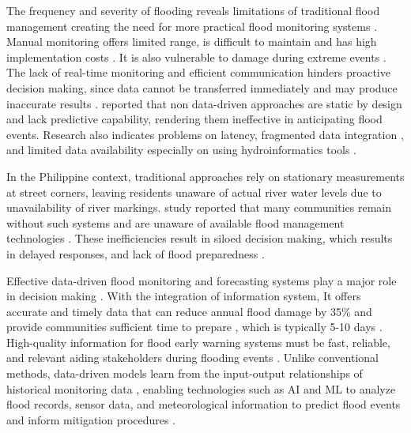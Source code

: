 \documentclass{research}
\begin{document}
The frequency and severity of flooding reveals limitations of traditional flood 
management creating the need for more practical flood monitoring systems 
\cite{bukhari2025review} \cite{Won_Lee_Moon_Moon_2022} \cite{KHOSHKONESH2024175859}.
Manual monitoring offers limited range, is difficult to maintain and has high 
implementation costs \cite{Pahuriray_Cerna_2025}. It is also vulnerable to damage 
during extreme events \cite{idoghor2026remote} \cite{Sengupta_2024}. The lack of 
real-time monitoring and efficient communication hinders proactive decision making, 
since data cannot be transferred immediately and may produce inaccurate results 
\cite{Ikechukwu_Idigo_Nnebe_Ozue_Agwunobi_2024} \cite{tolentino2022real}. 
\cite{Attobrah_Ohaka_Ifionu_Njemanze_Okonkwo_2026} reported 
that non data-driven approaches are static by design and lack predictive capability, 
rendering them ineffective in anticipating flood events. Research also indicates
problems on latency, fragmented data integration \cite{Khan2025}, and limited data availability 
especially on using hydroinformatics tools \cite{w15010178}.

In the Philippine context, traditional approaches rely on stationary measurements 
at street corners, leaving residents unaware of actual river water levels 
\cite{Crucillo_Lucero_Gelito_Medina_Palconit_2026} due to unavailability of river markings. 
\cite{demesa2025gis} study reported that many communities remain 
without such systems and are unaware of available flood management technologies 
. These inefficiencies result in siloed decision making, which results in 
delayed responses, and lack of flood preparedness 
\cite{Mukherjee2024} \cite{rs17173104}.

Effective data-driven flood monitoring and forecasting systems play a major role 
in decision making \cite{koutsovili2023early}. With the integration of information system,
It offers accurate and timely data 
that can reduce annual flood damage by 35\% \cite{samansiri2023characteristics} 
and provide communities sufficient time to prepare 
\cite{w14142221} \cite{Mirro2025} \cite{kuhaneswaran2025evolution}, 
which is typically 5-10 days \cite{palash2024datadriven}. 
High-quality information for flood early warning systems must be fast, reliable, 
and relevant aiding stakeholders during flooding events 
\cite{Hammood_Hammood_Aliesawi_Osiobe_Hasan_Malallah_Abbas_2024}. 
Unlike conventional methods, data-driven models learn from the input-output 
relationships of historical monitoring data \cite{GAO2024132228}, enabling 
technologies such as AI and ML to analyze flood records, sensor data, and 
meteorological information to predict flood events and inform mitigation 
procedures \cite{anik2025evolution}.
\end{document}
